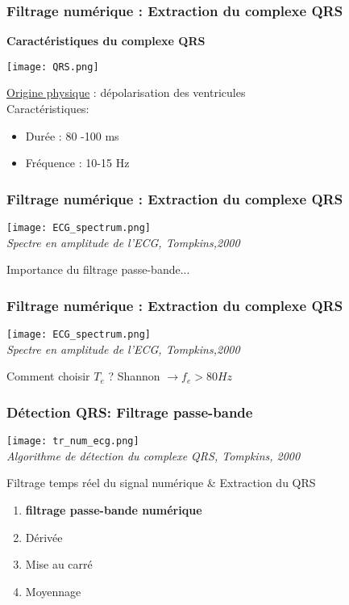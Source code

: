 \documentclass{beamer}
\begin{document}
\begin{frame}
\frametitle{Filtrage numérique :  Extraction du complexe QRS}
\textbf{Caractéristiques du complexe QRS}
\begin{center}
\texttt{[image: QRS.png]}\\

\end{center}
\underline{Origine physique} : dépolarisation des ventricules\\
\vspace{0.3cm}
Caractéristiques: \\
\vspace{0.1cm}
\begin{itemize}
\item Durée :  80 -100 ms
\item Fréquence : 10-15 Hz 
\end{itemize}

\end{frame}

\begin{frame}
\frametitle{Filtrage numérique :  Extraction du complexe QRS}
\begin{center}
\texttt{[image: ECG\_spectrum.png]}\\
\textit{\scriptsize Spectre en amplitude de l'ECG, Tompkins,2000}\\
\vspace{0.1cm}
\end{center}
Importance du filtrage passe-bande...
\end{frame}

\begin{frame}
\frametitle{Filtrage numérique :  Extraction du complexe QRS}
\begin{center}
\texttt{[image: ECG\_spectrum.png]}\\
\textit{\scriptsize Spectre en amplitude de l'ECG, Tompkins,2000}\\
\vspace{0.1cm}
\end{center}
Comment choisir $T_e$ ?  {Shannon $\rightarrow f_e > 80 Hz$   }


\end{frame}

\begin{frame}
\frametitle{Détection QRS: Filtrage passe-bande}
\begin{center}
\texttt{[image: tr\_num\_ecg.png]}\\
\textit{\footnotesize Algorithme de détection du complexe QRS, Tompkins, 2000}\\
\vspace{0.3cm}
\end{center}
Filtrage temps réel du signal numérique \& Extraction du QRS
\begin{enumerate}
\item \textbf{filtrage passe-bande numérique}
\item Dérivée 
\item Mise au carré 
\item Moyennage
\end{enumerate}
\end{frame}
\end{document}

